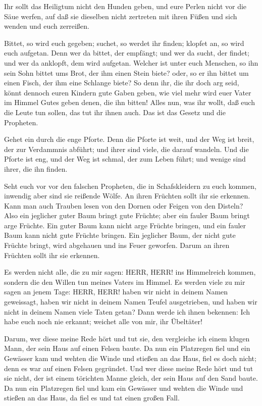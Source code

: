  Ihr sollt das Heiligtum nicht den Hunden geben, und eure
Perlen nicht vor die Säue werfen, auf daß sie dieselben nicht zertreten
mit ihren Füßen und sich wenden und euch zerreißen.

 Bittet, so wird euch gegeben; suchet, so werdet ihr finden;
klopfet an, so wird euch aufgetan.  Denn wer da bittet, der
empfängt; und wer da sucht, der findet; und wer da anklopft, dem wird
aufgetan.  Welcher ist unter euch Menschen, so ihn sein Sohn
bittet ums Brot, der ihm einen Stein biete?  oder, so er
ihn bittet um einen Fisch, der ihm eine Schlange biete?  So
denn ihr, die ihr doch arg seid, könnt dennoch euren Kindern gute Gaben
geben, wie viel mehr wird euer Vater im Himmel Gutes geben denen, die
ihn bitten!  Alles nun, was ihr wollt, daß euch die Leute
tun sollen, das tut ihr ihnen auch. Das ist das Gesetz und die
Propheten.

 Gehet ein durch die enge Pforte. Denn die Pforte ist weit,
und der Weg ist breit, der zur Verdammnis abführt; und ihrer sind viele,
die darauf wandeln.  Und die Pforte ist eng, und der Weg
ist schmal, der zum Leben führt; und wenige sind ihrer, die ihn finden.

 Seht euch vor vor den falschen Propheten, die in
Schafskleidern zu euch kommen, inwendig aber sind sie reißende Wölfe.
 An ihren Früchten sollt ihr sie erkennen. Kann man auch
Trauben lesen von den Dornen oder Feigen von den Disteln? 
Also ein jeglicher guter Baum bringt gute Früchte; aber ein fauler Baum
bringt arge Früchte.  Ein guter Baum kann nicht arge
Früchte bringen, und ein fauler Baum kann nicht gute Früchte bringen.
 Ein jeglicher Baum, der nicht gute Früchte bringt, wird
abgehauen und ins Feuer geworfen.  Darum an ihren Früchten
sollt ihr sie erkennen.

 Es werden nicht alle, die zu mir sagen: HERR, HERR! ins
Himmelreich kommen, sondern die den Willen tun meines Vaters im Himmel.
 Es werden viele zu mir sagen an jenem Tage: HERR, HERR!
haben wir nicht in deinem Namen geweissagt, haben wir nicht in deinem
Namen Teufel ausgetrieben, und haben wir nicht in deinem Namen viele
Taten getan?  Dann werde ich ihnen bekennen: Ich habe euch
noch nie erkannt; weichet alle von mir, ihr Übeltäter!

 Darum, wer diese meine Rede hört und tut sie, den
vergleiche ich einem klugen Mann, der sein Haus auf einen Felsen baute.
 Da nun ein Platzregen fiel und ein Gewässer kam und wehten
die Winde und stießen an das Haus, fiel es doch nicht; denn es war auf
einen Felsen gegründet.  Und wer diese meine Rede hört und
tut sie nicht, der ist einem törichten Manne gleich, der sein Haus auf
den Sand baute.  Da nun ein Platzregen fiel und kam ein
Gewässer und wehten die Winde und stießen an das Haus, da fiel es und
tat einen großen Fall.

